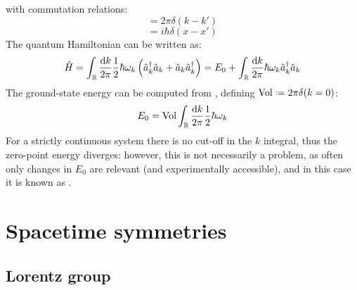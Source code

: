 with commutation relations:
\begin{equation}
  [\hat{a}_k, \hat{a}_{k'}^\dagger] = 2\pi \delta(k - k')
\end{equation}
\begin{equation}
  [\hat\phi(x,t), \hat\Pi(x',t)] = i\hbar \delta(x - x')
\end{equation}
The quantum Hamiltonian can be written as:
\begin{equation}
  \hat{H} = \int_{\mathbb{R}} \frac{\mathrm{d} k}{2\pi} \frac{1}{2} \hbar \omega_k \left( \hat{a}_k^\dagger \hat{a}_k + \hat{a}_k \hat{a}_k^\dagger \right) = E_0 + \int_{\mathbb{R}} \frac{\mathrm{d} k}{2\pi} \hbar \omega_k \hat{a}_k^\dagger \hat{a}_k
\end{equation}
The ground-state energy can be computed from , defining $ \mathrm{Vol} \defeq 2\pi \delta(k = 0) $:
\begin{equation}
  E_0 = \mathrm{Vol} \int_{\mathbb{R}} \frac{\mathrm{d} k}{2\pi} \frac{1}{2} \hbar \omega_k
\end{equation}
For a strictly continuous system there is no cut-off in the $ k $ integral, thus the zero-point energy diverges: however, this is not necessarily a problem, as often only changes in $ E_0 $ are relevant (and experimentally accessible), and in this case it is known as .

\newpage

\section{Spacetime symmetries}

\subsection{Lorentz group}

